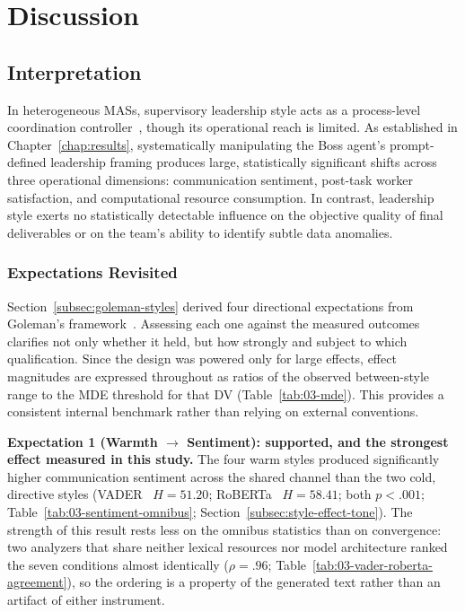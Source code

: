 \chapter{Discussion}
\label{chap:discussion}

\section{Interpretation}
\label{sec:interpretation}

In heterogeneous \acp{MAS}, supervisory leadership style acts as a process-level coordination controller~\cite{kwak2026leadershipcoordinationcontrolbehavioral}, though its operational reach is limited.
As established in Chapter~\ref{chap:results}, systematically manipulating the Boss agent's prompt-defined leadership framing produces large, statistically significant shifts across three operational dimensions: communication sentiment, post-task worker satisfaction, and computational resource consumption.
In contrast, leadership style exerts no statistically detectable influence on the objective quality of final deliverables or on the team's ability to identify subtle data anomalies.

\subsection{Expectations Revisited}
\label{subsec:expectations-revisited}

Section~\ref{subsec:goleman-styles} derived four directional expectations from Goleman's framework~\cite{goleman2000leadership}.
Assessing each one against the measured outcomes clarifies not only whether it held, but how strongly and subject to which qualification.
Since the design was powered only for large effects, effect magnitudes are expressed throughout as ratios of the observed between-style range to the \ac{MDE} threshold for that \ac{DV} (Table~\ref{tab:03-mde}).
This provides a consistent internal benchmark rather than relying on external conventions.

\textbf{Expectation 1 (Warmth $\rightarrow$ Sentiment): supported, and the strongest effect measured in this study.}
The four warm styles produced significantly higher communication sentiment across the shared channel than the two cold, directive styles (\ac{VADER}~\cite{hutto2014vader} $H = 51.20$; \ac{RoBERTa}~\cite{loureiro2022timelmsdiachroniclanguagemodels} $H = 58.41$; both $p < .001$; Table~\ref{tab:03-sentiment-omnibus}; Section~\ref{subsec:style-effect-tone}).
The strength of this result rests less on the omnibus statistics than on convergence: two analyzers that share neither lexical resources nor model architecture ranked the seven conditions almost identically ($\rho = .96$; Table~\ref{tab:03-vader-roberta-agreement}), so the ordering is a property of the generated text rather than an artifact of either instrument.

